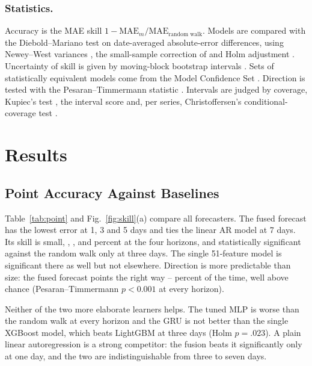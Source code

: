 \documentclass[runningheads]{llncs}
\begin{document}
\subsubsection{Statistics.} Accuracy is the MAE skill $1-\mathrm{MAE}_m/\mathrm{MAE}_{\text{random walk}}$. Models are compared with the Diebold--Mariano test \cite{diebold1995} on date-averaged absolute-error differences, using Newey--West variances \cite{newey1987}, the small-sample correction of \cite{harvey1997} and Holm adjustment \cite{holm1979}. Uncertainty of skill is given by moving-block bootstrap intervals \cite{kunsch1989}. Sets of statistically equivalent models come from the Model Confidence Set \cite{hansen2011}. Direction is tested with the Pesaran--Timmermann statistic \cite{pesaran1992}. Intervals are judged by coverage, Kupiec's test \cite{kupiec1995}, the interval score \cite{gneiting2007} and, per series, Christoffersen's conditional-coverage test \cite{christoffersen1998}.

\section{Results}
\subsection{Point Accuracy Against Baselines}
Table~\ref{tab:point} and Fig.~\ref{fig:skill}(a) compare all forecasters. The fused forecast has the lowest error at 1, 3 and 5 days and ties the linear AR model at 7 days. Its skill is small, \SkFusA{}, \SkFusB{}, \SkFusC{} and \SkFusD{} percent at the four horizons, and statistically significant against the random walk only at three days. The single 51-feature model is significant there as well but not elsewhere. Direction is more predictable than size: the fused forecast points the right way \HitA{}--\HitD{} percent of the time, well above chance (Pesaran--Timmermann $p<0.001$ at every horizon).

Neither of the two more elaborate learners helps. The tuned MLP is worse than the random walk at every horizon and the GRU is not better than the single XGBoost model, which beats LightGBM at three days (Holm $p=.023$). A plain linear autoregression is a strong competitor: the fusion beats it significantly only at one day, and the two are indistinguishable from three to seven days.

\begin{table}[!htb]
\centering
\caption{Pooled out-of-sample accuracy: MAE of log-returns ($\times10^2$, best in bold) and statistical tests.}
\label{tab:point}
\setlength{\tabcolsep}{4pt}
\resizebox{\textwidth}{!}{}
\end{table}
\end{document}
